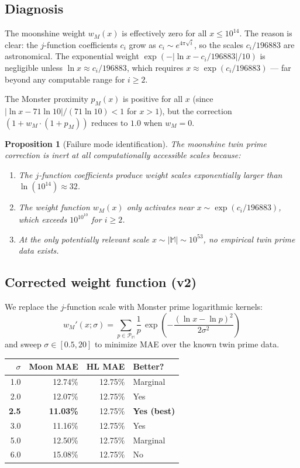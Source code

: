 \documentclass[11pt]{amsart}
\newtheorem{proposition}[theorem]{Proposition}
\theoremstyle{definition}
\begin{document}
\subsection{Diagnosis}

The moonshine weight $w_M(x)$ is effectively zero for all $x \leq 10^{14}$. The reason is clear: the $j$-function coefficients $c_i$ grow as $c_i \sim e^{4\pi\sqrt{i}}$, so the scales $c_i/196883$ are astronomical. The exponential weight $\exp(-|\ln x - c_i/196883|/10)$ is negligible unless $\ln x \approx c_i/196883$, which requires $x \approx \exp(c_i/196883)$ --- far beyond any computable range for $i \geq 2$.

The Monster proximity $p_M(x)$ is positive for all $x$ (since $|\ln x - 71\ln 10|/(71\ln 10) < 1$ for $x > 1$), but the correction $(1 + w_M \cdot (1 + p_M))$ reduces to $1.0$ when $w_M = 0$.

\begin{proposition}[Failure mode identification]
The moonshine twin prime correction is \emph{inert} at all computationally accessible scales because:
\begin{enumerate}[label=(\roman*)]
\item The $j$-function coefficients produce weight scales exponentially larger than $\ln(10^{14}) \approx 32$.
\item The weight function $w_M(x)$ only activates near $x \sim \exp(c_i/196883)$, which exceeds $10^{10^{10}}$ for $i \geq 2$.
\item At the only potentially relevant scale $x \sim |\mathbb{M}| \sim 10^{53}$, no empirical twin prime data exists.
\end{enumerate}
\end{proposition}

\subsection{Corrected weight function (v2)}

We replace the $j$-function scale with Monster prime logarithmic kernels:
\begin{equation}
w_M'(x; \sigma) = \sum_{p \in \mathcal{P}_{\mathbb{M}}} \frac{1}{p}\, \exp\!\left(-\frac{(\ln x - \ln p)^2}{2\sigma^2}\right)
\end{equation}
and sweep $\sigma \in [0.5, 20]$ to minimize MAE over the known twin prime data.

\begin{center}
\begin{tabular}{r r r l}
\toprule
$\sigma$ & Moon MAE & HL MAE & Better? \\
\midrule
1.0 & 12.74\% & 12.75\% & Marginal \\
2.0 & 12.07\% & 12.75\% & Yes \\
\textbf{2.5} & \textbf{11.03\%} & 12.75\% & \textbf{Yes (best)} \\
3.0 & 11.16\% & 12.75\% & Yes \\
5.0 & 12.50\% & 12.75\% & Marginal \\
6.0 & 15.08\% & 12.75\% & No \\
\bottomrule
\end{tabular}
\end{center}
\end{document}
